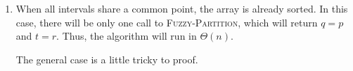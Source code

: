 \begin{enumerate}
\begin{framed}
\begin{enumerate}
{\begin{algorithm}[H]
\SetAlgoNoEnd\DontPrintSemicolon
\BlankLine
{}
\nonl{}
\end{algorithm}

\begin{algorithm}[H]
\SetAlgoNoEnd\DontPrintSemicolon
\BlankLine
{}
\nonl{}
\end{algorithm}
}

\newpage

\item{When all intervals share a common point, the array is already sorted. In
this case, there will be only one call to \textsc{Fuzzy-Partition}, which will
return $q = p$ and $t = r$. Thus, the algorithm will run in $\Theta(n)$.

The general case is a little tricky to proof.}
\end{enumerate}
\end{framed}

\end{enumerate}

